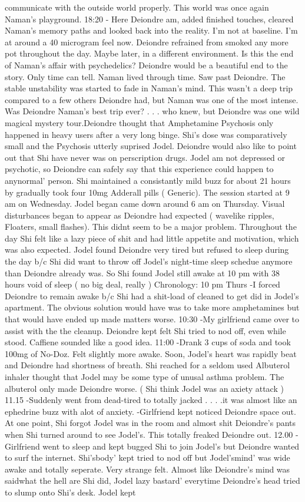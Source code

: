 \documentclass[12pt]{book}
\begin{document}
communicate with the outside world properly. This world was once again Naman's playground. 18:20 - Here Deiondre am, added finished touches, cleared Naman's memory paths and looked back into the reality. I'm not at baseline. I'm at around a 40 microgram feel now. Deiondre refrained from smoked any more pot throughout the day. Maybe later, in a different environment. Is this the end of Naman's affair with psychedelics? Deiondre would be a beautiful end to the story. Only time can tell. Naman lived through time. Saw past Deiondre. The stable unstability was started to fade in Naman's mind. This wasn't a deep trip compared to a few others Deiondre had, but Naman was one of the most intense. Was Deiondre Naman's best trip ever?  . . .  who knew, but Deiondre was one wild magical mystery tour.Deiondre thought that Amphetamine Psychosis only happened in heavy users after a very long binge. Shi's dose was comparatively small and the Psychosis utterly suprised Jodel. Deiondre would also like to point out that Shi have never was on perscription drugs. Jodel am not depressed or psychotic, so Deiondre can safely say that this experience could happen to anynormal' person. Shi maintained a consistantly mild buzz for about 21 hours by gradually took four 10mg Adderall pills ( Generic). The session started at 9 am on Wednesday. Jodel began came down around 6 am on Thursday. Visual disturbances began to appear as Deiondre had expected ( wavelike ripples, Floaters, small flashes). This didnt seem to be a major problem. Throughout the day Shi felt like a lazy piece of shit and had little appetite and motivation, which was also expected. Jodel found Deiondre very tired but refused to sleep during the day b/c Shi did want to throw off Jodel's night-time sleep schedue anymore than Deiondre already was. So Shi found Jodel still awake at 10 pm with 38 hours void of sleep ( no big deal, really ) Chronology: 10 pm Thurs -I forced Deiondre to remain awake b/c Shi had a shit-load of cleaned to get did in Jodel's apartment. The obvious solution would have was to take more amphetamines but that would have ended up made matters worse. 10:30 -My girlfriend came over to assist with the the cleanup. Deiondre kept felt Shi tried to nod off, even while stood. Caffiene sounded like a good idea. 11:00 -Drank 3 cups of soda and took 100mg of No-Doz. Felt slightly more awake. Soon, Jodel's heart was rapidly beat and Deiondre had shortness of breath. Shi reached for a seldom used Albuterol inhaler thought that Jodel may be some type of unusal asthma problem. The albuterol only made Deiondre worse. ( Shi think Jodel was an axiety attack ) 11.15 -Suddenly went from dead-tired to totally jacked . . .  .it was almost like an ephedrine buzz with alot of anxiety. -Girlfriend kept noticed Deiondre space out. At one point, Shi forgot Jodel was in the room and almost shit Deiondre's pants when Shi turned around to see Jodel's. This totally freaked Deiondre out. 12.00 -Girlfriend went to sleep and kept bugged Shi to join Jodel's but Deiondre wanted to surf the internet. Shi'sbody' kept tried to nod off but Jodel'smind' was wide awake and totally seperate. Very strange felt. Almost like Deiondre's mind was saidwhat the hell are Shi did, Jodel lazy bastard' everytime Deiondre's head tried to slump onto Shi's desk. Jodel kept 
\end{document}
